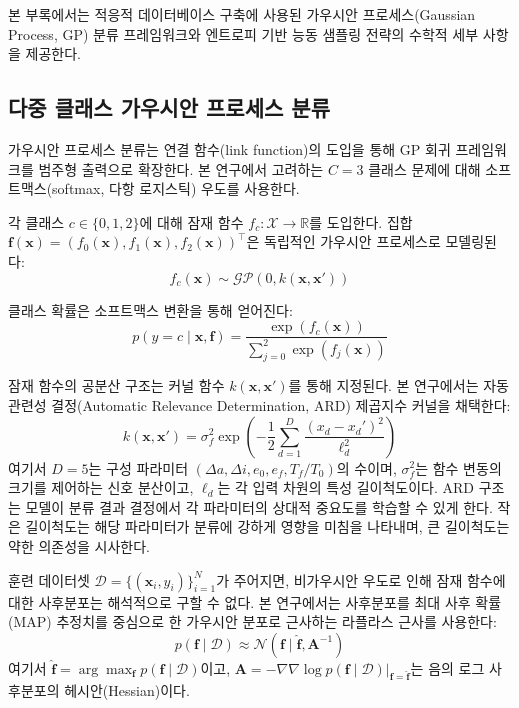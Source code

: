 \documentclass[a4paper,fleqn]{cas-dc}
\let\origsubsection\subsection
\renewcommand{\subsection}{\FloatBarrier\origsubsection}
\begin{document}
본 부록에서는 적응적 데이터베이스 구축에 사용된 가우시안 프로세스(Gaussian Process, GP) 분류 프레임워크와 엔트로피 기반 능동 샘플링 전략의 수학적 세부 사항을 제공한다.

\subsection{다중 클래스 가우시안 프로세스 분류}

가우시안 프로세스 분류는 연결 함수(link function)의 도입을 통해 GP 회귀 프레임워크를 범주형 출력으로 확장한다. 본 연구에서 고려하는 $C = 3$ 클래스 문제에 대해 소프트맥스(softmax, 다항 로지스틱) 우도를 사용한다.

각 클래스 $c \in \{0, 1, 2\}$에 대해 잠재 함수 $f_c: \mathcal{X} \rightarrow \mathbb{R}$를 도입한다. 집합 $\mathbf{f}(\mathbf{x}) = (f_0(\mathbf{x}), f_1(\mathbf{x}), f_2(\mathbf{x}))^\top$은 독립적인 가우시안 프로세스로 모델링된다:
\begin{equation}
f_c(\mathbf{x}) \sim \mathcal{GP}(0, k(\mathbf{x}, \mathbf{x}'))
\end{equation}

클래스 확률은 소프트맥스 변환을 통해 얻어진다:
\begin{equation}\label{eq:softmax}
p(y = c \mid \mathbf{x}, \mathbf{f}) = \frac{\exp(f_c(\mathbf{x}))}{\sum_{j=0}^{2} \exp(f_j(\mathbf{x}))}
\end{equation}

잠재 함수의 공분산 구조는 커널 함수 $k(\mathbf{x}, \mathbf{x}')$를 통해 지정된다. 본 연구에서는 자동 관련성 결정(Automatic Relevance Determination, ARD) 제곱지수 커널을 채택한다:
\begin{equation}\label{eq:ard_kernel}
k(\mathbf{x}, \mathbf{x}') = \sigma_f^2 \exp\left(-\frac{1}{2} \sum_{d=1}^{D} \frac{(x_d - x_d')^2}{\ell_d^2}\right)
\end{equation}
여기서 $D = 5$는 구성 파라미터 $(\Delta a, \Delta i, e_0, e_f, T_f/T_0)$의 수이며, $\sigma_f^2$는 함수 변동의 크기를 제어하는 신호 분산이고, $\ell_d$는 각 입력 차원의 특성 길이척도이다. ARD 구조는 모델이 분류 결과 결정에서 각 파라미터의 상대적 중요도를 학습할 수 있게 한다. 작은 길이척도는 해당 파라미터가 분류에 강하게 영향을 미침을 나타내며, 큰 길이척도는 약한 의존성을 시사한다.

훈련 데이터셋 $\mathcal{D} = \{(\mathbf{x}_i, y_i)\}_{i=1}^{N}$가 주어지면, 비가우시안 우도로 인해 잠재 함수에 대한 사후분포는 해석적으로 구할 수 없다. 본 연구에서는 사후분포를 최대 사후 확률(MAP) 추정치를 중심으로 한 가우시안 분포로 근사하는 라플라스 근사를 사용한다:
\begin{equation}
p(\mathbf{f} \mid \mathcal{D}) \approx \mathcal{N}(\mathbf{f} \mid \hat{\mathbf{f}}, \mathbf{A}^{-1})
\end{equation}
여기서 $\hat{\mathbf{f}} = \arg\max_{\mathbf{f}} p(\mathbf{f} \mid \mathcal{D})$이고, $\mathbf{A} = -\nabla\nabla \log p(\mathbf{f} \mid \mathcal{D})|_{\mathbf{f}=\hat{\mathbf{f}}}$는 음의 로그 사후분포의 헤시안(Hessian)이다.
\end{document}
